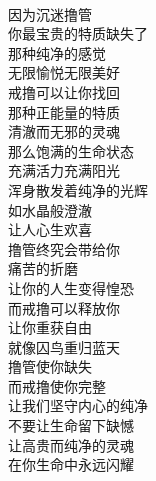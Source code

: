 \begin{poem}[戒撸使你完整]
    \begin{multicols}{2}
        \begin{center}~\\
            因为沉迷撸管 \\ 你最宝贵的特质缺失了 \\ 那种纯净的感觉 \\ 无限愉悦无限美好 \\ 戒撸可以让你找回 \\ 那种正能量的特质 \\ 清澈而无邪的灵魂 \\ 那么饱满的生命状态 \\ 充满活力充满阳光 \\ 浑身散发着纯净的光辉 \\ 如水晶般澄澈 \\ 让人心生欢喜 \\ 撸管终究会带给你 \\ 痛苦的折磨 \\ 让你的人生变得惶恐 \\ 而戒撸可以释放你 \\ 让你重获自由 \\ 就像囚鸟重归蓝天 \\ 撸管使你缺失 \\ 而戒撸使你完整 \\ 让我们坚守内心的纯净 \\ 不要让生命留下缺憾 \\ 让高贵而纯净的灵魂 \\ 在你生命中永远闪耀
        \end{center}
    \end{multicols}
\end{poem}


